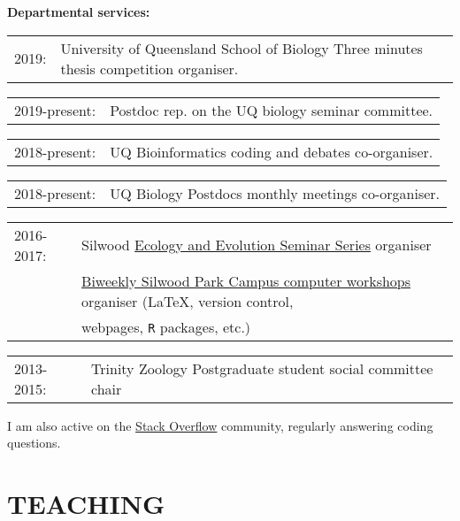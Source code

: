 \documentclass[10pt,a4paper]{article}
\begin{document}
{\raggedright\textbf{Departmental services:}

\begin{tabular}{ll}
2019: & University of Queensland School of Biology Three minutes thesis competition organiser.\\
\end{tabular}
\begin{tabular}{ll}
2019-present: & Postdoc rep. on the UQ biology seminar committee.\\
\end{tabular}
\begin{tabular}{ll}
2018-present: & UQ Bioinformatics coding and debates co-organiser.\\
\end{tabular}
\begin{tabular}{ll}
2018-present: & UQ Biology Postdocs monthly meetings co-organiser.\\
\end{tabular}
\begin{tabular}{ll}
2016-2017: & Silwood \href{http://www.imperial.ac.uk/silwood-park/research/thursday-seminars/}{Ecology and Evolution Seminar Series} organiser\\
    & \href{https://silwoodcomputerskillz.github.io/}{Biweekly Silwood Park Campus computer workshops} organiser (\LaTeX, version control,\\
    & webpages, \texttt{R} packages, etc.) \\
\end{tabular}
\begin{tabular}{ll}
2013-2015: & Trinity Zoology Postgraduate student social committee chair \\
\end{tabular}
\bigskip

I am also active on the \href{https://stackoverflow.com/users/9281298/thomas-guillerme}{Stack Overflow} community, regularly answering coding questions.


\section{TEACHING}
\bigskip

}
\end{document}
